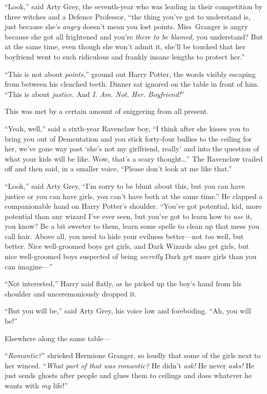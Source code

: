 “Look,” said Arty Grey, the seventh-year who was leading in their competition by three witches and a Defence Professor, “the thing you’ve got to understand is, just because she’s \emph{angry} doesn’t mean you lost points. Miss~Granger is angry because she got all frightened and you’re \emph{there to be blamed,} you understand? But at the same time, even though she won’t admit it, she’ll be touched that her boyfriend went to such ridiculous and frankly insane lengths to protect her.”

“This is not about \emph{points,}” ground out Harry Potter, the words visibly escaping from between his clenched teeth. Dinner sat ignored on the table in front of him. “This is about \emph{justice.} And \emph{I\@. Am. Not. Her. Boyfriend!}”

This was met by a certain amount of sniggering from all present.

“Yeah, well,” said a sixth-year Ravenclaw boy, “I think after she kisses you to bring you out of Dementation and you stick forty-four bullies to the ceiling for her, we’ve gone way past ‘she’s not my girlfriend, really’ and into the question of what your kids will be like. Wow, that’s a scary thought…” The Ravenclaw trailed off and then said, in a smaller voice, “Please don’t look at me like that.”

“Look,” said Arty Grey, “I’m sorry to be blunt about this, but you can have justice or you can have girls, you can’t have both at the same time.” He clapped a companionable hand on Harry Potter’s shoulder. “You’ve got potential, kid, more potential than any wizard I’ve ever seen, but you’ve got to learn how to \emph{use} it, you know? Be a bit sweeter to them, learn some spells to clean up that mess you call hair. Above all, you need to hide your evilness better—not \emph{too} well, but better. Nice well-groomed boys get girls, and Dark Wizards also get girls, but nice well-groomed boys suspected of being \emph{secretly} Dark get more girls than you can imagine—”

“Not interested,” Harry said flatly, as he picked up the boy’s hand from his shoulder and unceremoniously dropped it.

“But you will be,” said Arty Grey, his voice low and foreboding. “Ah, you will be!”

Elsewhere along the same table—

“\emph{Romantic?}” shrieked Hermione Granger, so loudly that some of the girls next to her winced. “\emph{What part of that was romantic?} He didn’t \emph{ask!} He never \emph{asks!} He just sends ghosts after people and glues them to ceilings and does whatever he wants with \emph{my} life!”

